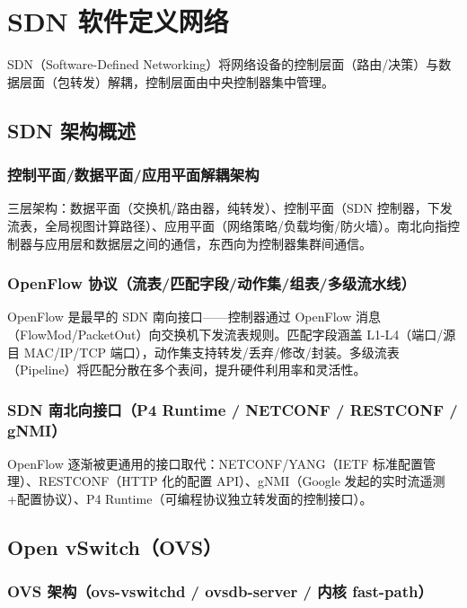 \documentclass[12pt,UTF8]{ctexbook}
\begin{document}
\chapter{SDN 软件定义网络}
\label{chap:sdn}

SDN（Software-Defined Networking）将网络设备的控制层面（路由/决策）与数据层面（包转发）解耦，控制层面由中央控制器集中管理。

  \section{SDN 架构概述}
    \subsection{控制平面/数据平面/应用平面解耦架构}

三层架构：数据平面（交换机/路由器，纯转发）、控制平面（SDN 控制器，下发流表，全局视图计算路径）、应用平面（网络策略/负载均衡/防火墙）。南北向指控制器与应用层和数据层之间的通信，东西向为控制器集群间通信。

    \subsection{OpenFlow 协议（流表/匹配字段/动作集/组表/多级流水线）}

OpenFlow 是最早的 SDN 南向接口——控制器通过 OpenFlow 消息（FlowMod/PacketOut）向交换机下发流表规则。匹配字段涵盖 L1-L4（端口/源目 MAC/IP/TCP 端口），动作集支持转发/丢弃/修改/封装。多级流表（Pipeline）将匹配分散在多个表间，提升硬件利用率和灵活性。

    \subsection{SDN 南北向接口（P4 Runtime / NETCONF / RESTCONF / gNMI）}

OpenFlow 逐渐被更通用的接口取代：NETCONF/YANG（IETF 标准配置管理）、RESTCONF（HTTP 化的配置 API）、gNMI（Google 发起的实时流遥测+配置协议）、P4 Runtime（可编程协议独立转发面的控制接口）。

  \section{Open vSwitch（OVS）}
    \subsection{OVS 架构（ovs-vswitchd / ovsdb-server / 内核 fast-path）}
\end{document}
